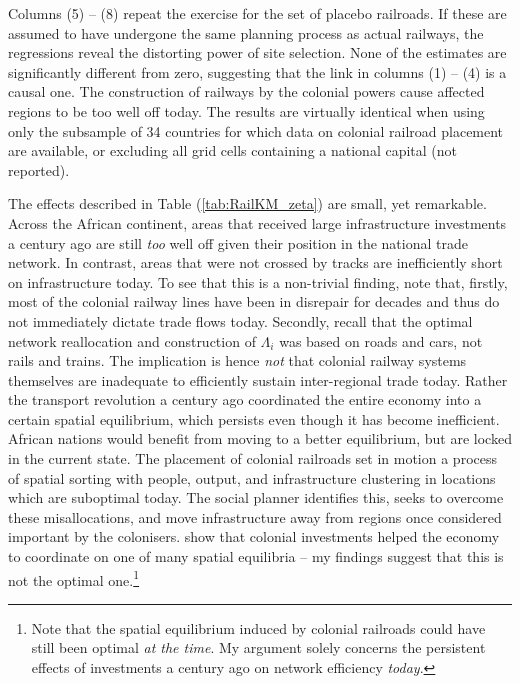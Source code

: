 \documentclass[11pt, oneside]{article}   	%
\let\oldref\ref
\renewcommand{\ref}[1]{(\oldref{#1})}
\begin{document}
Columns (5) -- (8) repeat the exercise for the set of placebo railroads. If these are assumed to have undergone the same planning process as actual railways, the regressions reveal the distorting power of site selection. None of the estimates are significantly different from zero, suggesting that the link in columns (1) -- (4) is a causal one. The construction of railways by the colonial powers cause affected regions to be too well off today. The results are virtually identical when using only the subsample of 34 countries for which data on colonial railroad placement are available, or excluding all grid cells containing a national capital (not reported).

The effects described in Table \ref{tab:RailKM_zeta} are small, yet remarkable. Across the African continent, areas that received large infrastructure investments a century ago are still \emph{too} well off given their position in the national trade network. In contrast, areas that were not crossed by tracks are inefficiently short on infrastructure today. To see that this is a non-trivial finding, note that, firstly, most of the colonial railway lines have been in disrepair for decades and thus do not immediately dictate trade flows today. Secondly, recall that the optimal network reallocation and construction of $\Lambda_{i}$ was based on roads and cars, not rails and trains. The implication is hence \emph{not} that colonial railway systems themselves are inadequate to efficiently sustain inter-regional trade today. Rather the transport revolution a century ago coordinated the entire economy into a certain spatial equilibrium, which persists even though it has become inefficient. African nations would benefit from moving to a better equilibrium, but are locked in the current state. The placement of colonial railroads set in motion a process of spatial sorting with people, output, and infrastructure clustering in locations which are suboptimal today. The social planner identifies this, seeks to overcome these misallocations, and move infrastructure away from regions once considered important by the colonisers. \citeauthor{Jedwab_PermanentEffectsTransportation_2016a} show that colonial investments helped the economy to coordinate on one of many spatial equilibria -- my findings suggest that this is not the optimal one.\footnote{Note that the spatial equilibrium induced by colonial railroads could have still been optimal \emph{at the time}. My argument solely concerns the persistent effects of investments a century ago on network efficiency \emph{today}.}
\end{document}
